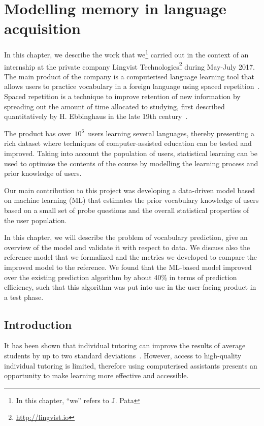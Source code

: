 \chapter{Modelling memory in language acquisition}
\label{sec:lingvist}

In this chapter, we describe the work that we\footnote{In this chapter, ``we'' refers to J. Pata} carried out in the context of an internship at the private company Lingvist Technologies\footnote{\url{http://lingvist.io}} during May-July 2017. The main product of the company is a computerised language learning tool that allows users to practice vocabulary in a foreign language using spaced repetition~\cite{lingvist}. Spaced repetition is a technique to improve retention of new information by spreading out the amount of time allocated to studying, first described quantitatively by H. Ebbinghaus in the late 19th century~\cite{ebbinghaus}.

The product has over~$10^6$~users learning several languages, thereby presenting a rich dataset where techniques of computer-assisted education can be tested and improved. Taking into account the population of users, statistical learning can be used to optimise the contents of the course by modelling the learning process and prior knowledge of users.

Our main contribution to this project was developing a data-driven model based on machine learning (ML) that estimates the prior vocabulary knowledge of users based on a small set of probe questions and the overall statistical properties of the user population. 

In this chapter, we will describe the problem of vocabulary prediction, give an overview of the model and validate it with respect to data. We discuss also the reference model that we formalized and the metrics we developed to compare the improved model to the reference. We found that the ML-based model improved over the existing prediction algorithm by about 40\% in terms of prediction efficiency, such that this algorithm was put into use in the user-facing product in a test phase.

\section{Introduction}
It has been shown that individual tutoring can improve the results of average students by up to two standard deviations~\cite{corbett2001cognitive}. However, access to high-quality individual tutoring is limited, therefore using computerised assistants presents an opportunity to make learning more effective and accessible.

